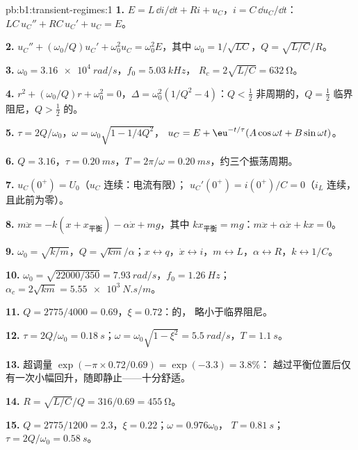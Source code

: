 \begin{solution}{pb:b1:transient-regimes:1}
\textbf{1.} $E = L\,\dd i/\dd t + Ri + u_C$，$i = C\,\dd u_C/\dd t$：
$LC\,u_C'' + RC\,u_C' + u_C = E$。

\textbf{2.} $u_C'' + (\omega_0/Q)u_C' + \omega_0^2u_C = \omega_0^2E$，其中
$\omega_0 = 1/\sqrt{LC}$，$Q = \sqrt{L/C}/R$。

\textbf{3.} $\omega_0 = \qty{3.16e4}{rad/s}$，$f_0 = \qty{5.03}{kHz}$，
$R_c = 2\sqrt{L/C} = \qty{632}{\ohm}$。

\textbf{4.} $r^2 + (\omega_0/Q)r + \omega_0^2 = 0$，$\Delta = \omega_0^2(1/Q^2
- 4)$：$Q < \tfrac12$ 非周期的，$Q = \tfrac12$ 临界阻尼，$Q > \tfrac12$
的。

\textbf{5.} $\tau = 2Q/\omega_0$，$\omega = \omega_0\sqrt{1 - 1/4Q^2}$，
$u_C = E + \eu^{-t/\tau}(A\cos\omega t + B\sin\omega t)$。

\textbf{6.} $Q = 3.16$，$\tau = \qty{0.20}{ms}$，$T = 2\pi/\omega =
\qty{0.20}{ms}$，约三个振荡周期。

\textbf{7.} $u_C(0^+) = U_0$（$u_C$ 连续：电流有限）；
$u_C'(0^+) = i(0^+)/C = 0$（$i_L$ 连续，且此前为零）。

\textbf{8.} $m\ddot x = -k(x + x_{\text{平衡}}) - \alpha\dot x + mg$，其中
$kx_{\text{平衡}} = mg$：$m\ddot x + \alpha\dot x + kx = 0$。

\textbf{9.} $\omega_0 = \sqrt{k/m}$，$Q = \sqrt{km}/\alpha$；$x \leftrightarrow
q$，$\dot x \leftrightarrow i$，$m \leftrightarrow L$，$\alpha \leftrightarrow
R$，$k \leftrightarrow 1/C$。

\textbf{10.} $\omega_0 = \sqrt{22000/350} = \qty{7.93}{rad/s}$，$f_0 =
\qty{1.26}{Hz}$；$\alpha_c = 2\sqrt{km} = \qty{5.55e3}{N.s/m}$。

\textbf{11.} $Q = 2775/4000 = 0.69$，$\xi = 0.72$：的，
略小于临界阻尼。

\textbf{12.} $\tau = 2Q/\omega_0 = \qty{0.18}{s}$；$\omega = \omega_0\sqrt{1
- \xi^2} = \qty{5.5}{rad/s}$，$T = \qty{1.1}{s}$。

\textbf{13.} 超调量 $\exp(-\pi \times 0.72/0.69) = \exp(-3.3) = 3.8\%$：
越过平衡位置后仅有一次小幅回升，随即静止——十分舒适。

\textbf{14.} $R = \sqrt{L/C}/Q = 316/0.69 = \qty{455}{\ohm}$。

\textbf{15.} $Q = 2775/1200 = 2.3$，$\xi = 0.22$；$\omega = 0.976\omega_0$，
$T = \qty{0.81}{s}$；$\tau = 2Q/\omega_0 = \qty{0.58}{s}$。


\end{solution}
